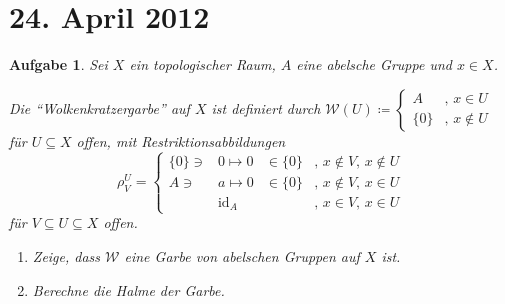 \documentclass[paper = A4, fontsize=12pt, numbers=noendperiod, chapterprefix=true]{scrbook}
\theoremstyle{break}
\newtheorem{Aufg}{Aufgabe}
\theoremstyle{nonumberbreak}
\theoremstyle{nonumberplain}
\DeclareMathOperator{\id}{id}
\begin{document}
\section{24. April 2012}
\setcounter{Aufg}{0} %
\setcounter{Loes}{0}

\begin{Aufg}
 Sei $X$ ein topologischer Raum, $A$ eine abelsche Gruppe und $x \in X$. 

Die "`Wolkenkratzergarbe"' auf $X$ ist definiert durch 
$\mathcal{W}(U) \coloneqq \left\{ \begin{array}{ll}
                                   A & ,\, x \in U\\
                                   \{0\} & ,\,x \notin U
                                  \end{array}
\right.$ f\"ur $U \subseteq X$ offen, mit Restriktionsabbildungen 
$$\rho_V^U = \left\{ \begin{array}{rcll}
                     \{0\} \ni &0 \mapsto 0& \in \{0\}& ,\, x \notin V,\, x \notin U\\
                     A \ni &a \mapsto 0& \in \{0\}& ,\, x \notin V,\, x \in U\\
                     & \id_A && ,\,x \in V,\, x \in U
                    \end{array} \right.$$ f\"ur $V \subseteq U \subseteq X$ offen.
\begin{enumerate}%
 \item Zeige, dass $\mathcal{W}$ eine Garbe von abelschen Gruppen auf $X$ ist.
 \item Berechne die Halme der Garbe.
\end{enumerate}
\end{Aufg}
\end{document}
